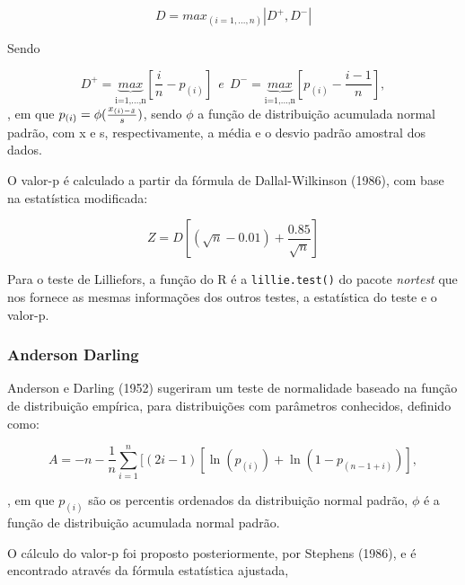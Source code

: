 \documentclass[a4paper,11pt]{article} %
\begin{document}
\begin{equation}
   D = max_{(i=1,...,n)}|D^{+},D^{-}|
\end{equation}

Sendo

\begin{equation}
    D^{+} =   \underbrace{max}_{\mbox{i=1,...,n}}    {\left[\frac{i}{n} - p_{(i)}\right]} \ \ e \ \ D^{-} = \underbrace{max}_{\mbox{i=1,...,n}}  {\left[p_{(i)} - \frac{i-1}{n}\right]},
\end{equation}
, em que $ p_{(i)}= \phi( \frac{x_{(i)-\Bar{x}}}{s} )$, sendo $\phi$ a função de distribuição acumulada normal padrão, com x e s, respectivamente, a média e o desvio padrão amostral dos dados.

\vspace{0.5cm}

O valor-p é calculado a partir da fórmula de Dallal-Wilkinson (1986), com base na estatística modificada:

\begin{equation}
    Z = D \left[(\sqrt{n} - 0.01) + \frac{0.85}{\sqrt{n}} \right]
\end{equation}

\vspace{0.5cm}

Para o teste de Lilliefors, a função do R é a \texttt{lillie.test()} do pacote \textit{nortest} que nos fornece as mesmas informações dos outros testes, a estatística do teste e o valor-p.

\subsubsection{Anderson Darling}

Anderson e Darling (1952) sugeriram um teste de normalidade baseado na função de distribuição empírica, para distribuições com parâmetros conhecidos, definido como: 

\begin{equation}
    A = -n - \frac{1}{n} \sum_{i=1}^{n} [(2i-1)[ \ln (p_{(i)}) + \ln(1- p_{(n-1+i)})],
\end{equation}

\noindent , em que $p_{(i)}$ são os percentis ordenados da distribuição normal padrão, $\phi$ é a função de distribuição acumulada normal padrão.

\vspace{0.5cm}

O cálculo do valor-p foi proposto posteriormente, por Stephens (1986), e é encontrado através da fórmula estatística ajustada,
\end{document}
